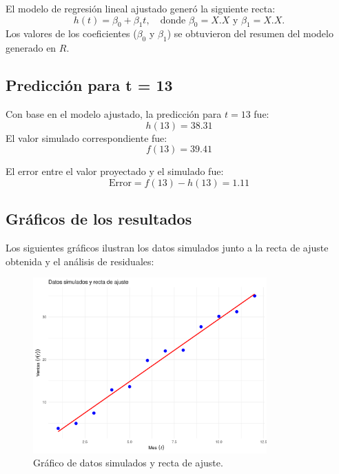 \documentclass[a4paper,12pt]{article}
\begin{document}
El modelo de regresión lineal ajustado generó la siguiente recta:
\[
h(t) = \beta_0 + \beta_1 t, \quad \text{donde } \beta_0 = X.X \text{ y } \beta_1 = X.X.
\]
Los valores de los coeficientes (\( \beta_0 \) y \( \beta_1 \)) se obtuvieron del resumen del modelo generado en \( R \).

\subsection{Predicción para t = 13}

Con base en el modelo ajustado, la predicción para \( t = 13 \) fue:
\[
h(13) = 38.31
\]
El valor simulado correspondiente fue:
\[
f(13) = 39.41
\]

El error entre el valor proyectado y el simulado fue:
\[
\text{Error} = f(13) - h(13) = 1.11
\]

\subsection{Gráficos de los resultados}

Los siguientes gráficos ilustran los datos simulados junto a la recta de ajuste obtenida y el análisis de residuales:

\begin{figure}[H]
    \centering
    \includegraphics[width=0.8\textwidth]{resultados_regresion.png}
    \caption{Gráfico de datos simulados y recta de ajuste.}
    \label{fig:regresion}
\end{figure}
\end{document}
